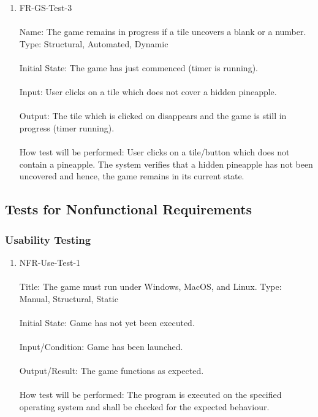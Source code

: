 \documentclass[12pt, titlepage]{article}
\begin{document}
\begin{enumerate}
\item{FR-GS-Test-3\\\\}
Name: The game remains in progress if a tile uncovers a blank or a number.
Type: Structural, Automated, Dynamic\\\\
Initial State: The game has just commenced (timer is running).\\\\
Input: User clicks on a tile which does not cover a hidden pineapple.\\\\
Output: The tile which is clicked on disappears and the game is still in progress (timer running).\\\\
How test will be performed: User clicks on a tile/button which does not contain a pineapple. The system verifies that a hidden pineapple has not been uncovered and hence, the game remains in its current state.\\

\end{enumerate}

\newpage
\subsection{Tests for Nonfunctional Requirements}
\subsubsection{Usability Testing}
		
\begin{enumerate}
\item{NFR-Use-Test-1\\\\}
Title: The game must run under Windows, MacOS, and Linux.
Type: Manual, Structural, Static\\\\
Initial State: Game has not yet been executed.\\\\
Input/Condition: Game has been launched.\\\\
Output/Result: The game functions as expected.\\\\
How test will be performed: The program is executed on the specified operating system and shall be checked for the expected behaviour.\\
\end{enumerate}
\end{document}
